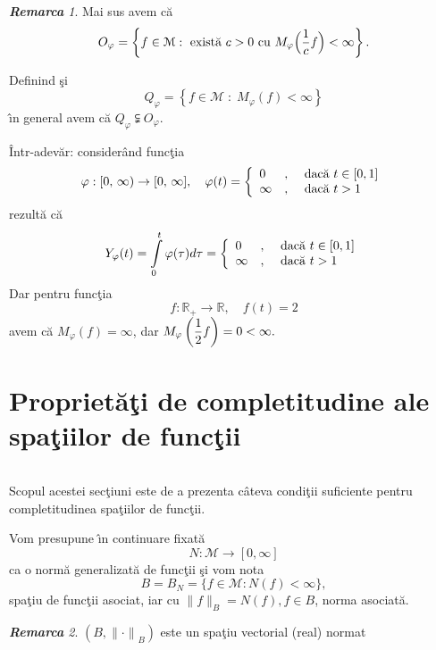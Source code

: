 \documentclass[ a4paper, 12pt]{report}
\theoremstyle{definition}
\theoremstyle{remark}
\newtheorem{remarc}{\bf Remarca}[section]
\numberwithin{equation}{section}
\begin{document}
\begin{remarc} Mai sus avem c\u a
$$O_\varphi = \left\{ f \in \mathcal{M} : \hbox{ exist\u a } c > 0 \hbox{ cu } M_\varphi\Big(\frac{1}{c}f\Big)<\infty\right\}.$$

Definind \c si  $$Q_\varphi = \left\{ f \in \mathcal{M} \; : \; M_\varphi(f)<\infty\right\}$$
\^\i n general avem c\u a $Q_\varphi \subsetneqq O_\varphi$.
\end{remarc}
 \^ Intr-adev\u ar: consider\^ and func\c tia
$$\varphi : [0,\, \infty) \rightarrow [0, \, \infty], \quad \varphi(t) = \left\{\begin{array}{lcl}
0&,& \hbox{ dac\u a } t \in [0,1]\\
\infty&,& \hbox{ dac\u a } t>1 \end{array} \right.$$
rezult\u a c\u a
$$Y_\varphi(t) =\int\limits_{0}^{t} \varphi(\tau)d\tau=\left\{\begin{array}{lcl}
0&,& \hbox{ dac\u a } t \in [0,1]\\
\infty&,& \hbox{ dac\u a } t>1 \end{array} \right.$$
Dar pentru func\c tia
$$f : \mathbb{R}_+ \rightarrow \mathbb{R}, \quad f(t) = 2$$
avem c\u a
$M_\varphi(f) = \infty$, dar $M_\varphi\left(\displaystyle\frac{1}{2} f\right) = 0 < \infty.$



\newpage




\section{Propriet\u a\c ti de completitudine ale spa\c tiilor de func\c tii}

$\,$

\vspace{1cm}

Scopul acestei sec\c tiuni este de a prezenta c\^ ateva condi\c tii suficiente pentru completitudinea spa\c tiilor de func\c tii.

\smallskip

Vom presupune \^\i n continuare fixat\u a
$$N : \mathcal{M} \rightarrow [0,\infty]$$ ca o norm\u a generalizat\u a de func\c tii \c si vom nota
$$B=B_N=\{f \in \mathcal{M} : N(f) < \infty\},$$ spa\c tiu de func\c tii asociat, iar cu $\lVert f \rVert_B = N(f), f \in B$, norma asociat\u a.

\begin{remarc}
$(B,{\lVert \cdot \rVert}_B)$ este un spa\c tiu vectorial (real) normat
\end{remarc}
\end{document}
